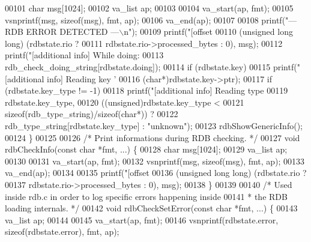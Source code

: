 \begin{DoxyCode}
{{{00101     \textcolor{keywordtype}{char} msg[1024];
00102     va\_list ap;
00103 
00104     va\_start(ap, fmt);
00105     vsnprintf(msg, \textcolor{keyword}{sizeof}(msg), fmt, ap);
00106     va\_end(ap);
00107 
00108     printf(\textcolor{stringliteral}{"--- RDB ERROR DETECTED ---\(\backslash\)n"});
00109     printf(\textcolor{stringliteral}{"[offset %
00110         (\textcolor{keywordtype}{unsigned} \textcolor{keywordtype}{long} \textcolor{keywordtype}{long}) (rdbstate.rio ?
00111             rdbstate.rio->processed\_bytes : 0), msg);
00112     printf(\textcolor{stringliteral}{"[additional info] While doing: %
00113         rdb\_check\_doing\_string[rdbstate.doing]);
00114     \textcolor{keywordflow}{if} (rdbstate.key)
00115         printf(\textcolor{stringliteral}{"[additional info] Reading key '%
00116             (\textcolor{keywordtype}{char}*)rdbstate.key->ptr);
00117     \textcolor{keywordflow}{if} (rdbstate.key\_type != -1)
00118         printf(\textcolor{stringliteral}{"[additional info] Reading type %
00119             rdbstate.key\_type,
00120             ((\textcolor{keywordtype}{unsigned})rdbstate.key\_type <
00121              \textcolor{keyword}{sizeof}(rdb\_type\_string)/\textcolor{keyword}{sizeof}(\textcolor{keywordtype}{char}*)) ?
00122                 rdb\_type\_string[rdbstate.key\_type] : \textcolor{stringliteral}{"unknown"});
00123     rdbShowGenericInfo();
00124 \}
00125 
00126 \textcolor{comment}{/* Print informations during RDB checking. */}
00127 \textcolor{keywordtype}{void} rdbCheckInfo(\textcolor{keyword}{const} \textcolor{keywordtype}{char} *fmt, ...) \{
00128     \textcolor{keywordtype}{char} msg[1024];
00129     va\_list ap;
00130 
00131     va\_start(ap, fmt);
00132     vsnprintf(msg, \textcolor{keyword}{sizeof}(msg), fmt, ap);
00133     va\_end(ap);
00134 
00135     printf(\textcolor{stringliteral}{"[offset %
00136         (\textcolor{keywordtype}{unsigned} \textcolor{keywordtype}{long} \textcolor{keywordtype}{long}) (rdbstate.rio ?
00137             rdbstate.rio->processed\_bytes : 0), msg);
00138 \}
00139 
00140 \textcolor{comment}{/* Used inside rdb.c in order to log specific errors happening inside}
00141 \textcolor{comment}{ * the RDB loading internals. */}
00142 \textcolor{keywordtype}{void} rdbCheckSetError(\textcolor{keyword}{const} \textcolor{keywordtype}{char} *fmt, ...) \{
00143     va\_list ap;
00144 
00145     va\_start(ap, fmt);
00146     vsnprintf(rdbstate.error, \textcolor{keyword}{sizeof}(rdbstate.error), fmt, ap);
}}}}}}}}
\end{DoxyCode}
